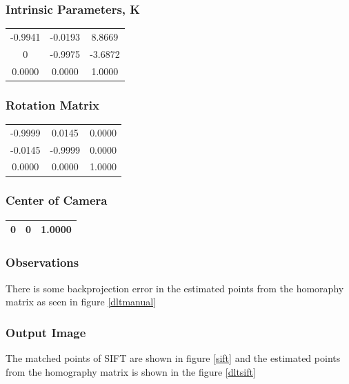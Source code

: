 \documentclass[12pt]{article}
\begin{document}
\subsubsection{Intrinsic Parameters, K}
\begin{tabular}{|c|c|c|}
\hline

 -0.9941  &  -0.0193  &  8.8669 \\ 
  0  &  -0.9975 &  -3.6872\\ 
  0.0000 &  0.0000 &  1.0000
\\ 
\hline
\end{tabular}

\subsubsection{Rotation Matrix}
\begin{tabular}{|c|c|c|}
\hline

 -0.9999  &  0.0145 &  0.0000 \\ 
  -0.0145   &  -0.9999 &  0.0000\\ 
  0.0000 &  0.0000 &  1.0000
\\ 
\hline
\end{tabular}
         

\subsubsection{Center of Camera}
\begin{tabular}{|c|c|c|}
\hline

 0  &  0 &  1.0000 \\ 
  \hline
\end{tabular}


\subsubsection{Observations}
There is some backprojection error in the estimated points from the homoraphy matrix as seen in figure \ref{dltmanual}

\subsubsection{Output Image}
The matched points of SIFT are shown in figure \ref{sift} and the estimated points from the homography matrix is shown in the figure  \ref{dltsift}
\end{document}
